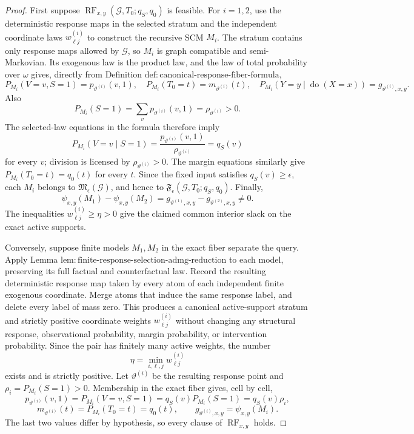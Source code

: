 \documentclass{article}
\begin{document}
\begin{proof}
First suppose \(\operatorname{RF}_{x,y}(\mathcal G,T_0;q_S,q_0)\) is feasible.  For \(i=1,2\), use the deterministic response maps in the selected stratum and the independent coordinate laws \(w^{(i)}_{\ell j}\) to construct the recursive SCM \(M_i\).  The stratum contains only response maps allowed by \(\mathcal G\), so \(M_i\) is graph compatible and semi-Markovian.  Its exogenous law is the product law, and the law of total probability over \(\omega\) gives, directly from Definition \(\mathrm{def{:}canonical\text{-}response\text{-}fiber\text{-}formula}\),
\[
 P_{M_i}(V=v,S=1)=p_{\vartheta^{(i)}}(v,1),
 \quad
 P_{M_i}(T_0=t)=m_{\vartheta^{(i)}}(t),
 \quad
 P_{M_i}(Y=y\mid\operatorname{do}(X=x))=g_{\vartheta^{(i)},x,y}.
\]
Also
\[
 P_{M_i}(S=1)=\sum_vp_{\vartheta^{(i)}}(v,1)
 =\rho_{\vartheta^{(i)}}>0.
\]
The selected-law equations in the formula therefore imply
\[
 P_{M_i}(V=v\mid S=1)
 =\frac{p_{\vartheta^{(i)}}(v,1)}{\rho_{\vartheta^{(i)}}}
 =q_S(v)
\]
for every \(v\); division is licensed by \(\rho_{\vartheta^{(i)}}>0\).  The margin equations similarly give \(P_{M_i}(T_0=t)=q_0(t)\) for every \(t\).  Since the fixed input satisfies \(q_S(v)\geq\epsilon\), each \(M_i\) belongs to \(\mathfrak M_{\epsilon}(\mathcal G)\), and hence to \(\mathfrak F_{\epsilon}(\mathcal G,T_0;q_S,q_0)\).  Finally,
\[
 \psi_{x,y}(M_1)-\psi_{x,y}(M_2)
 =g_{\vartheta^{(1)},x,y}-g_{\vartheta^{(2)},x,y}\neq0.
\]
The inequalities \(w^{(i)}_{\ell j}\geq\eta>0\) give the claimed common interior slack on the exact active supports.

Conversely, suppose finite models \(M_1,M_2\) in the exact fiber separate the query.  Apply Lemma \(\mathrm{lem{:}finite\text{-}response\text{-}selection\text{-}admg\text{-}reduction}\) to each model, preserving its full factual and counterfactual law.  Record the resulting deterministic response map taken by every atom of each independent finite exogenous coordinate.  Merge atoms that induce the same response label, and delete every label of mass zero.  This produces a canonical active-support stratum and strictly positive coordinate weights \(w^{(i)}_{\ell j}\) without changing any structural response, observational probability, margin probability, or intervention probability.  Since the pair has finitely many active weights, the number
\[
 \eta=\min_{i,\ell,j}w^{(i)}_{\ell j}
\]
exists and is strictly positive.  Let \(\vartheta^{(i)}\) be the resulting response point and \(\rho_i=P_{M_i}(S=1)>0\).  Membership in the exact fiber gives, cell by cell,
\[
 p_{\vartheta^{(i)}}(v,1)
 =P_{M_i}(V=v,S=1)
 =q_S(v)P_{M_i}(S=1)
 =q_S(v)\rho_i,
\]
\[
 m_{\vartheta^{(i)}}(t)=P_{M_i}(T_0=t)=q_0(t),
 \qquad
 g_{\vartheta^{(i)},x,y}=\psi_{x,y}(M_i).
\]
The last two values differ by hypothesis, so every clause of \(\operatorname{RF}_{x,y}\) holds.


\end{proof}
\end{document}
